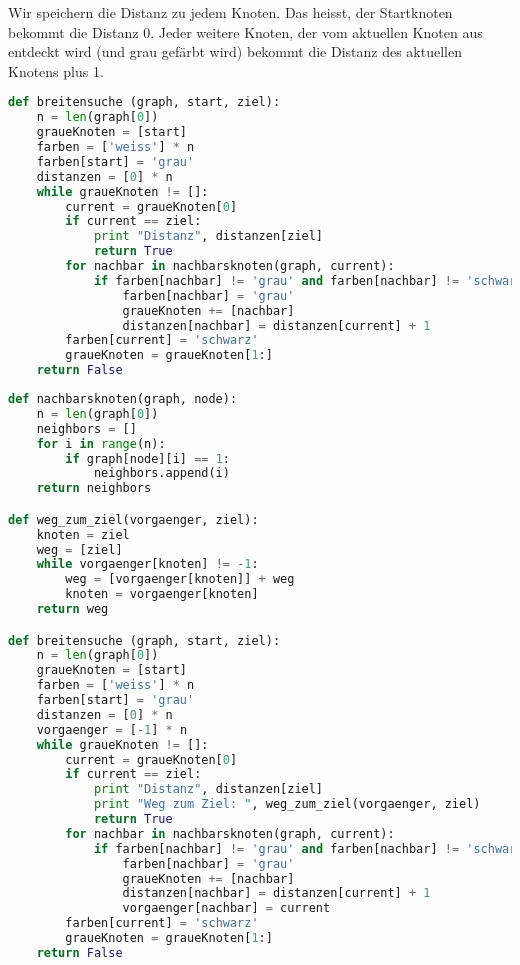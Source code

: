 \begin{lsg}
Wir speichern die Distanz zu jedem Knoten. Das heisst, der Startknoten bekommt die Distanz 0. Jeder weitere Knoten, der vom aktuellen Knoten aus entdeckt wird (und grau gef\"arbt wird) bekommt die Distanz des aktuellen Knotens plus 1.
\end{lsg}

\begin{lsg}
\hfill
\begin{lstlisting}[language=Python,basicstyle=\small,tabsize=3]
def breitensuche (graph, start, ziel):
	n = len(graph[0])
	graueKnoten = [start]
	farben = ['weiss'] * n
	farben[start] = 'grau'
	distanzen = [0] * n
	while graueKnoten != []:
		current = graueKnoten[0]
		if current == ziel:
			print "Distanz", distanzen[ziel]
			return True
		for nachbar in nachbarsknoten(graph, current):
			if farben[nachbar] != 'grau' and farben[nachbar] != 'schwarz':
				farben[nachbar] = 'grau'
				graueKnoten += [nachbar]
				distanzen[nachbar] = distanzen[current] + 1
		farben[current] = 'schwarz'
		graueKnoten = graueKnoten[1:]
	return False
\end{lstlisting}
\end{lsg}

\begin{lsg}
\hfill
\begin{lstlisting}[language=Python,basicstyle=\small,tabsize=3]
def nachbarsknoten(graph, node):
	n = len(graph[0])
	neighbors = []
	for i in range(n):
		if graph[node][i] == 1:
			neighbors.append(i)
	return neighbors

def weg_zum_ziel(vorgaenger, ziel):
	knoten = ziel
	weg = [ziel]	
	while vorgaenger[knoten] != -1:
		weg = [vorgaenger[knoten]] + weg
		knoten = vorgaenger[knoten]
	return weg

def breitensuche (graph, start, ziel):
	n = len(graph[0])
	graueKnoten = [start]
	farben = ['weiss'] * n
	farben[start] = 'grau'
	distanzen = [0] * n
	vorgaenger = [-1] * n
	while graueKnoten != []:
		current = graueKnoten[0]
		if current == ziel:
			print "Distanz", distanzen[ziel]
			print "Weg zum Ziel: ", weg_zum_ziel(vorgaenger, ziel)
			return True
		for nachbar in nachbarsknoten(graph, current):
			if farben[nachbar] != 'grau' and farben[nachbar] != 'schwarz':
				farben[nachbar] = 'grau'
				graueKnoten += [nachbar]
				distanzen[nachbar] = distanzen[current] + 1
				vorgaenger[nachbar] = current
		farben[current] = 'schwarz'
		graueKnoten = graueKnoten[1:]
	return False
\end{lstlisting}
\end{lsg}

